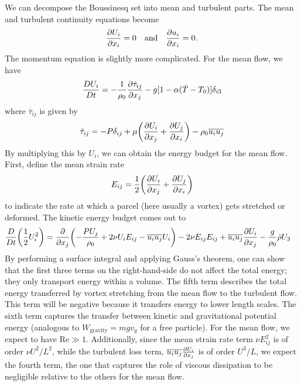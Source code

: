\documentclass[10pt]{article}
\renewcommand{\Re}{\mathrm{Re}}
\begin{document}
We can decompose the Boussinesq set into mean and turbulent parts. The mean and turbulent continuity equations become
\begin{align}
    \pdv{U_i}{x_i} = 0 \qq{and} \pdv{u_i}{x_i} = 0.
\end{align}
The momentum equation is slightly more complicated. For the mean flow, we have
\begin{align}
    \frac{DU_i}{Dt} = -\frac{1}{\rho_0}\pdv{\bar\tau_{ij}}{x_j} - g[1-\alpha(\bar{T} - T_0)]\delta_{i3}
\end{align}
where $\bar\tau_{ij}$ is given by
\begin{align}
    \bar\tau_{ij} = -P\delta_{ij} + \mu\qty(\pdv{U_i}{x_j} + \pdv{U_j}{x_i}) - \rho_0\overline{u_iu_j}
\end{align}
By multiplying this by $U_i$, we can obtain the energy budget for the mean flow. First, define the mean strain rate
\begin{align}
    E_{ij} = \frac{1}{2}\qty(\pdv{U_i}{x_j} + \pdv{U_j}{x_i})
\end{align}
to indicate the rate at which a parcel (here usually a vortex) gets stretched or deformed. The kinetic energy budget comes out to
\begin{align}
    \frac{D}{Dt}\qty(\frac{1}{2}U_i^2) & = \pdv{x_j}\qty(-\frac{PU_j}{\rho_0} + 2\nu U_iE_{ij} - \overline{u_iu_j}U_i) - 2\nu E_{ij}E_{ij} + \overline{u_iu_j}\pdv{U_i}{x_j} - \frac{g}{\rho_0}\bar\rho U_3
\end{align}
By performing a surface integral and applying Gauss's theorem, one can show that the first three terms on the right-hand-side do not affect the total energy; they only transport energy within a volume. The fifth term describes the total energy transferred by vortex stretching from the mean flow to the turbulent flow. This term will be negative because it transfers energy to lower length scales. The sixth term captures the transfer between kinetic and gravitational potential energy (analogous to $W_{\text{gravity}} = mgv_y$ for a free particle). For the mean flow, we expect to have $\Re \gg 1$. Additionally, since the mean strain rate term $\nu E_{ij}^2$ is of order $\nu U^2/L^2$, while the turbulent loss term, $\overline{u_iu_j}\pdv{U_i}{x_j}$ is of order $U^3/L$, we expect the fourth term, the one that captures the role of viscous dissipation to be negligible relative to the others for the mean flow.
\end{document}
